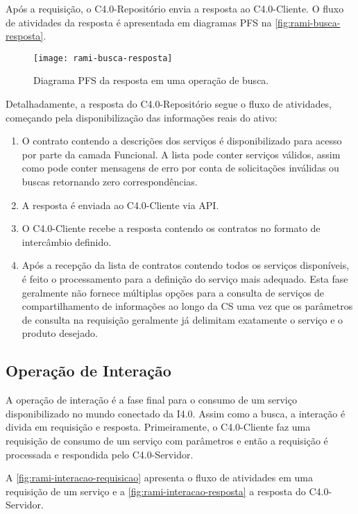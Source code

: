 Após a requisição, o C4.0-Repositório envia a resposta ao C4.0-Cliente. O fluxo de atividades da resposta é apresentada em diagramas PFS na \autoref{fig:rami-busca-resposta}.

\begin{figure}[th]
	\centering
	\texttt{[image: rami-busca-resposta]}
	\caption{Diagrama PFS da resposta em uma operação de busca.}
	\label{fig:rami-busca-resposta}
\end{figure}

Detalhadamente, a resposta do C4.0-Repositório segue o fluxo de atividades, começando pela disponibilização das informações reais do ativo:

\begin{enumerate}
	\item O contrato contendo a descrições dos serviços é disponibilizado para acesso por parte da camada Funcional. A lista  pode conter serviços válidos, assim como pode conter mensagens de erro por conta de solicitações inválidas ou buscas retornando zero correspondências.

	\item A resposta é enviada ao C4.0-Cliente via API.

	\item O C4.0-Cliente recebe a resposta contendo os contratos no formato de intercâmbio definido.

	\item Após a recepção da lista de contratos contendo todos os serviços disponíveis, é feito o processamento para a definição do serviço mais adequado. Esta fase geralmente não fornece múltiplas opções para a consulta de serviços de compartilhamento de informações ao longo da CS uma vez que os parâmetros de consulta na requisição geralmente já delimitam exatamente o serviço e o produto desejado.
\end{enumerate}

\subsection{Operação de Interação}

A operação de interação é a fase final para o consumo de um serviço disponibilizado no mundo conectado da I4.0. Assim como a busca, a interação é divida em requisição e resposta. Primeiramente, o C4.0-Cliente faz uma requisição de consumo de um serviço com parâmetros e então a requisição é processada e respondida pelo C4.0-Servidor.

A \autoref{fig:rami-interacao-requisicao} apresenta o fluxo de atividades em uma requisição de um serviço e a \autoref{fig:rami-interacao-resposta} a resposta do C4.0-Servidor.

